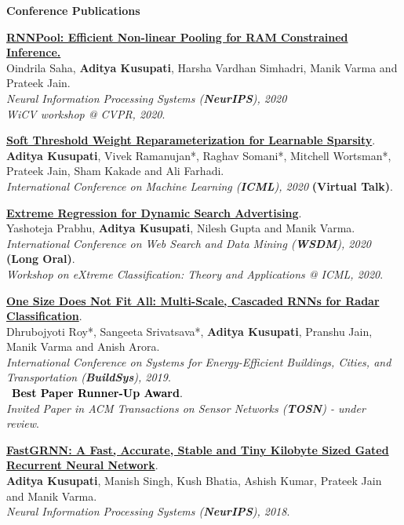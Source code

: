 \documentclass[10pt]{article}
\newcommand{\homepage}{https://homes.cs.washington.edu/~kusupati}
\begin{document}
\textbf{\large{Conference Publications}}
\begin{etaremune}
\item \href{\homepage/pubs/saha20.pdf}{\textbf{RNNPool: Efficient Non-linear Pooling for RAM Constrained Inference.}}\\
Oindrila Saha, \textbf{Aditya Kusupati}, Harsha Vardhan Simhadri, Manik Varma and Prateek Jain.\\
\emph{Neural Information Processing Systems (\textbf{NeurIPS}), 2020}\\
\emph{WiCV workshop @ CVPR, 2020}.

\item \href{\homepage/pubs/kusupati20.pdf}{\textbf{Soft Threshold Weight Reparameterization for Learnable Sparsity}}.\\
\textbf{Aditya Kusupati}, Vivek Ramanujan*, Raghav Somani*, Mitchell Wortsman*,\\ Prateek Jain, Sham Kakade and Ali Farhadi.\\
\emph{International Conference on Machine Learning (\textbf{ICML}), 2020} \textbf{(Virtual Talk)}.

\item \href{\homepage/pubs/prabhu20.pdf}{\textbf{Extreme Regression for Dynamic Search Advertising}}.\\
Yashoteja Prabhu, \textbf{Aditya Kusupati}, Nilesh Gupta and Manik Varma.\\
\emph{International Conference on Web Search and Data Mining (\textbf{WSDM}), 2020} \textbf{(Long Oral)}.\\
\emph{Workshop on eXtreme Classification: Theory and Applications @ ICML, 2020}.

\item \href{\homepage/pubs/roy19.pdf}{\textbf{One Size Does Not Fit All: Multi-Scale, Cascaded RNNs for Radar Classification}}.\\
Dhrubojyoti Roy*, Sangeeta Srivatsava*, \textbf{Aditya Kusupati}, Pranshu Jain, Manik Varma and Anish Arora.\\
\emph{International Conference on Systems for Energy-Efficient Buildings, Cities, and Transportation (\textbf{BuildSys}), 2019}.\\
\faTrophy \textcolor{black}{~\textbf{Best Paper Runner-Up Award}.}\\
\emph{Invited Paper in ACM Transactions on Sensor Networks (\textbf{TOSN}) - under review}.


\item \href{\homepage/pubs/kusupati18.pdf}{\textbf{FastGRNN: A Fast, Accurate, Stable and Tiny Kilobyte Sized Gated Recurrent Neural Network}}.\\
\textbf{Aditya Kusupati}, Manish Singh, Kush Bhatia, Ashish Kumar, Prateek Jain and Manik Varma.\\
\emph{Neural Information Processing Systems (\textbf{NeurIPS}), 2018}.
\end{etaremune}
\end{document}
